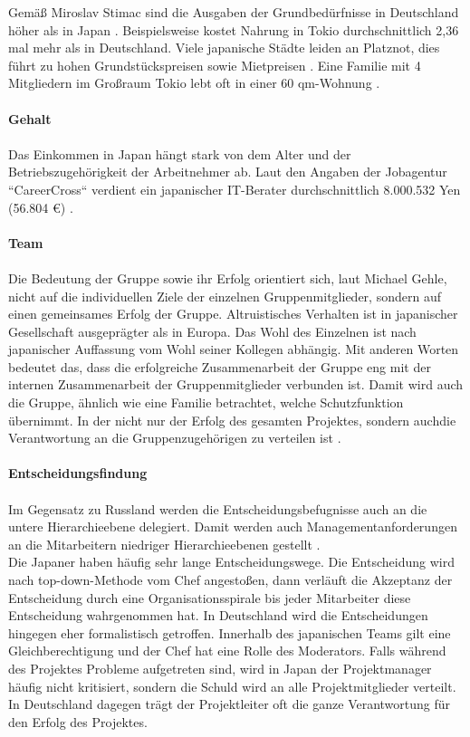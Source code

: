 		Gemäß Miroslav Stimac sind die Ausgaben der Grundbedürfnisse in Deutschland höher als in Japan \cite[101]{Stimac2004}.
		Beispielsweise kostet Nahrung in Tokio durchschnittlich 2,36 mal mehr als in Deutschland. Viele japanische Städte leiden an Platznot, dies führt zu hohen Grundstückspreisen sowie Mietpreisen \cite[105]{Stimac2004}.
		Eine Familie mit 4 Mitgliedern im Großraum Tokio lebt oft in einer 60 qm-Wohnung \cite{ArbZeitJP}.\\	\\
		\textbf{Gehalt}\\ \\
		Das Einkommen in Japan hängt stark von dem Alter und der Betriebszugehörigkeit
		der Arbeitnehmer ab.  Laut den Angaben der Jobagentur ``CareerCross`` verdient ein japanischer IT-Berater durchschnittlich 8.000.532 Yen (56.804 €) \cite{GehaltJapan}.
		 \\ \\
			\textbf{Team}\\
			\\
		Die Bedeutung der Gruppe sowie ihr Erfolg orientiert sich, laut Michael Gehle,  nicht auf die individuellen Ziele der einzelnen Gruppenmitglieder, sondern auf einen gemeinsames Erfolg der Gruppe. Altruistisches Verhalten ist in japanischer Gesellschaft ausgeprägter als in Europa. Das Wohl des Einzelnen ist nach japanischer Auffassung vom Wohl seiner Kollegen abhängig. Mit anderen Worten bedeutet das, dass die erfolgreiche Zusammenarbeit der Gruppe eng mit der internen Zusammenarbeit der Gruppenmitglieder verbunden ist. Damit wird auch die Gruppe, ähnlich wie eine Familie betrachtet, welche Schutzfunktion übernimmt. In der nicht nur der Erfolg des gesamten Projektes, sondern auchdie Verantwortung an die Gruppenzugehörigen zu verteilen ist \cite[233]{3LaenderVergl}.\\ \\
		\textbf{Entscheidungsfindung} \\ \\
		Im Gegensatz zu Russland werden die Entscheidungsbefugnisse auch an die untere Hierarchieebene delegiert. Damit werden auch Managementanforderungen an die  Mitarbeitern niedriger Hierarchieebenen gestellt \cite[233]{3LaenderVergl}.\\
		Die Japaner haben  häufig sehr lange Entscheidungswege. Die Entscheidung wird nach top-down-Methode vom Chef angestoßen, dann verläuft die Akzeptanz der Entscheidung durch eine Organisationsspirale bis jeder Mitarbeiter diese Entscheidung wahrgenommen hat. In Deutschland wird die Entscheidungen hingegen eher formalistisch getroffen. Innerhalb des japanischen Teams gilt eine Gleichberechtigung und der Chef hat eine Rolle des Moderators. Falls während des Projektes Probleme aufgetreten sind, wird in Japan der Projektmanager häufig nicht kritisiert, sondern die Schuld wird an alle Projektmitglieder verteilt. In Deutschland dagegen trägt der Projektleiter oft die ganze Verantwortung für den Erfolg des Projektes.
